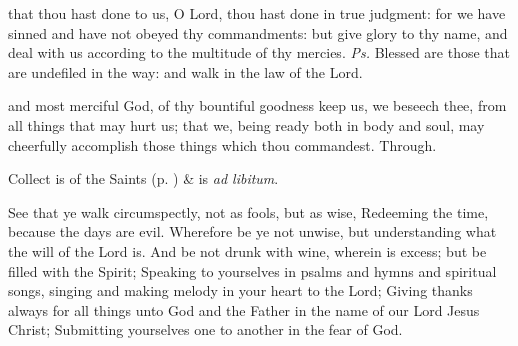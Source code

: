 


\properantiphonfix

\introit
{} that thou hast done to us, O Lord, thou hast done in true judgment: for we have sinned and have not obeyed thy commandments: but give glory to thy name, and deal with us according to the multitude of thy mercies. \textit{Ps.} Blessed are those that are undefiled in the way: and walk in the law of the Lord.

\collect
{} and most merciful God, of thy bountiful goodness keep us, we beseech thee, from all things that may hurt us; that we, being ready both in body and soul, may cheerfully accomplish those things which thou commandest. Through.
\begin{rubric}
     Collect is of the Saints (p. \pageref{SPSaints}) \&  is \emph{ad libitum}.
\end{rubric}

 See that ye walk circumspectly, not as fools, but as wise, Redeeming the time, because the days are evil. Wherefore be ye not unwise, but understanding what the will of the Lord is. And be not drunk with wine, wherein is excess; but be filled with the Spirit; Speaking to yourselves in psalms and hymns and spiritual songs, singing and making melody in your heart to the Lord; Giving thanks always for all things unto God and the Father in the name of our Lord Jesus Christ; Submitting yourselves one to another in the fear of God.



\vspace{-1ex}


